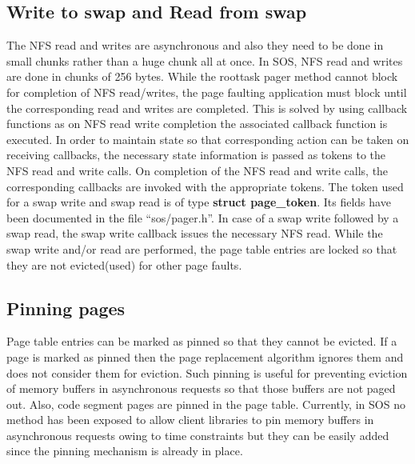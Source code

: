 \documentclass[a4paper, 11pt]{article}
\begin{document}
\subsection{Write to swap and Read from swap}
The NFS read and writes are asynchronous and also they need to be done
in small chunks rather than a huge chunk all at once. In SOS, NFS read
and writes are done in chunks of 256 bytes. While the roottask pager
method cannot block for completion of NFS read/writes, the page
faulting application must block until the corresponding read and
writes are completed. This is solved by using callback functions as on
NFS read write completion the associated callback function is
executed. In order to maintain state so that corresponding action can
be taken on receiving callbacks, the necessary state information is
passed as tokens to the NFS read and write calls. On completion of the
NFS read and write calls, the corresponding callbacks are invoked with
the appropriate tokens. The token used for a swap write and swap read
is of type {\bf struct page\_token}. Its fields have been documented
in the file ``sos/pager.h''. In case of a swap write followed by a
swap read, the swap write callback issues the necessary NFS
read. While the swap write and/or read are performed, the page table
entries are locked so that they are not evicted(used) for other page
faults. 
\subsection{Pinning pages}
Page table entries can be marked as pinned so that they cannot be
evicted. If a page is marked as pinned then the page replacement
algorithm ignores them and does not consider them for eviction. Such
pinning is useful for preventing eviction of memory buffers in
asynchronous requests so that those buffers are not paged
out. Also, code segment pages are pinned in the page table. Currently,
in SOS no method has been exposed to allow client libraries to pin
memory buffers in asynchronous requests owing to time constraints but
they can be easily added since the pinning mechanism is already in place.
\newpage
\end{document}
